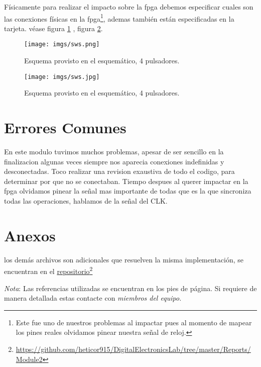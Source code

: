 \documentclass[paper=a4, fontsize=12pt]{article}        %
\newcommand\fnurl[2]{%
\href{#2}{#1}\footnote{\url{#2}}%
}
\numberwithin{equation}{section}                        %
\numberwithin{table}{section}                           %
\begin{document}
Físicamente para realizar el impacto sobre la fpga debemos especificar cuales son las conexiones físicas en la fpga\footnote{Este fue uno de nuestros problemas al impactar pues al momento de mapear los pines reales olvidamos pinear nuestra señal de reloj.}, ademas también están especificadas en la tarjeta. véase figura \ref{Sw1} , figura \ref{Sw2}.
\begin{figure}[H]
  \centering
     \texttt{[image: imgs/sws.png]}
  \caption{Esquema provisto en el esquemático, 4 pulsadores.}
    \label{Sw1}
\end{figure}
\begin{figure}[H]
  \centering
     \texttt{[image: imgs/sws.jpg]}
  \caption{Esquema provisto en el esquemático, 4 pulsadores.}
    \label{Sw2}
\end{figure}

\section{Errores Comunes}
En este modulo tuvimos muchos problemas, apesar de ser sencillo en la finalizacion algunas veces siempre nos aparecia conexiones indefinidas y desconectadas. Toco realizar una revision exaustiva de todo el codigo, para determinar por que no se conectaban.
Tiempo despues al querer impactar en la fpga olvidamos pinear la señal mas importante de todas que es la que sincroniza todas las operaciones, hablamos de la señal del CLK. 
\section{Anexos}
los demás archivos son adicionales que resuelven la misma implementación, se encuentran en el \fnurl{repositorio}{https://github.com/heticor915/DigitalElectronicsLab/tree/master/Reports/Module2}
\textit{Nota}: Las referencias utilizadas se encuentran en los pies de página. Si requiere de manera detallada estas contacte con \emph{miembros del equipo.}
\end{document}
